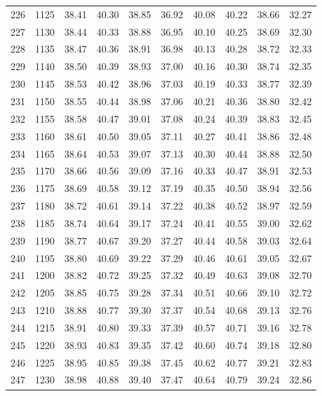 \begin{longtable}{rrllllllll}
226 & 1125 & 38.41 & 40.30 & 38.85 & 36.92 & 40.08 & 40.22 & 38.66 & 32.27 \\ 
227 & 1130 & 38.44 & 40.33 & 38.88 & 36.95 & 40.10 & 40.25 & 38.69 & 32.30 \\ 
228 & 1135 & 38.47 & 40.36 & 38.91 & 36.98 & 40.13 & 40.28 & 38.72 & 32.33 \\ 
229 & 1140 & 38.50 & 40.39 & 38.93 & 37.00 & 40.16 & 40.30 & 38.74 & 32.35 \\ 
230 & 1145 & 38.53 & 40.42 & 38.96 & 37.03 & 40.19 & 40.33 & 38.77 & 32.39 \\ 
231 & 1150 & 38.55 & 40.44 & 38.98 & 37.06 & 40.21 & 40.36 & 38.80 & 32.42 \\ 
232 & 1155 & 38.58 & 40.47 & 39.01 & 37.08 & 40.24 & 40.39 & 38.83 & 32.45 \\ 
233 & 1160 & 38.61 & 40.50 & 39.05 & 37.11 & 40.27 & 40.41 & 38.86 & 32.48 \\ 
234 & 1165 & 38.64 & 40.53 & 39.07 & 37.13 & 40.30 & 40.44 & 38.88 & 32.50 \\ 
235 & 1170 & 38.66 & 40.56 & 39.09 & 37.16 & 40.33 & 40.47 & 38.91 & 32.53 \\ 
236 & 1175 & 38.69 & 40.58 & 39.12 & 37.19 & 40.35 & 40.50 & 38.94 & 32.56 \\ 
237 & 1180 & 38.72 & 40.61 & 39.14 & 37.22 & 40.38 & 40.52 & 38.97 & 32.59 \\ 
238 & 1185 & 38.74 & 40.64 & 39.17 & 37.24 & 40.41 & 40.55 & 39.00 & 32.62 \\ 
239 & 1190 & 38.77 & 40.67 & 39.20 & 37.27 & 40.44 & 40.58 & 39.03 & 32.64 \\ 
240 & 1195 & 38.80 & 40.69 & 39.22 & 37.29 & 40.46 & 40.61 & 39.05 & 32.67 \\ 
241 & 1200 & 38.82 & 40.72 & 39.25 & 37.32 & 40.49 & 40.63 & 39.08 & 32.70 \\ 
242 & 1205 & 38.85 & 40.75 & 39.28 & 37.34 & 40.51 & 40.66 & 39.10 & 32.72 \\ 
243 & 1210 & 38.88 & 40.77 & 39.30 & 37.37 & 40.54 & 40.68 & 39.13 & 32.76 \\ 
244 & 1215 & 38.91 & 40.80 & 39.33 & 37.39 & 40.57 & 40.71 & 39.16 & 32.78 \\ 
245 & 1220 & 38.93 & 40.83 & 39.35 & 37.42 & 40.60 & 40.74 & 39.18 & 32.80 \\ 
246 & 1225 & 38.95 & 40.85 & 39.38 & 37.45 & 40.62 & 40.77 & 39.21 & 32.83 \\ 
247 & 1230 & 38.98 & 40.88 & 39.40 & 37.47 & 40.64 & 40.79 & 39.24 & 32.86 \\ 

\end{longtable}
